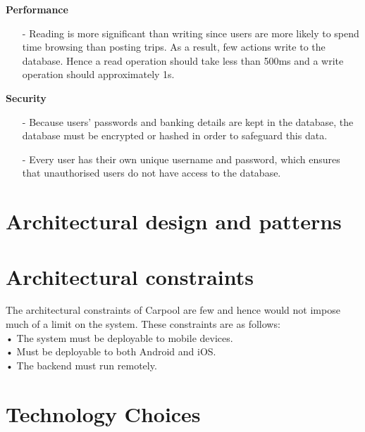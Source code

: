 \documentclass[hidelinks, 12pt, a4paper]{article}
\begin{document}
\vspace{0.5cm}
\large{ \textbf{Performance}}
\begin{itemize}
      \item[-] Reading is more significant than writing since users are more likely to spend time browsing than posting trips. As a result, few actions write to the database. Hence a read operation should take less than 500ms and a write operation should approximately 1s.
\end{itemize}
\vspace{0.5cm}
\large{ \textbf{Security}}
\begin{itemize}
      \item [-] Because users' passwords and banking details  are kept in the database, the database must be encrypted or hashed in order to safeguard this data.
      \item [-] Every user has their own unique username and password, which ensures that unauthorised users do not have access to the database.
\end{itemize}
\newpage
\section{Architectural design and patterns}

\newpage
\section{Architectural constraints}
The architectural constraints of Carpool are few and hence would not impose much of a limit on the system. These constraints are as follows:\\
•    The system must be deployable to mobile devices.\\
•    Must be deployable to both Android and iOS.\\
•    The backend must run remotely.\\
\section{Technology Choices}
\end{document}
